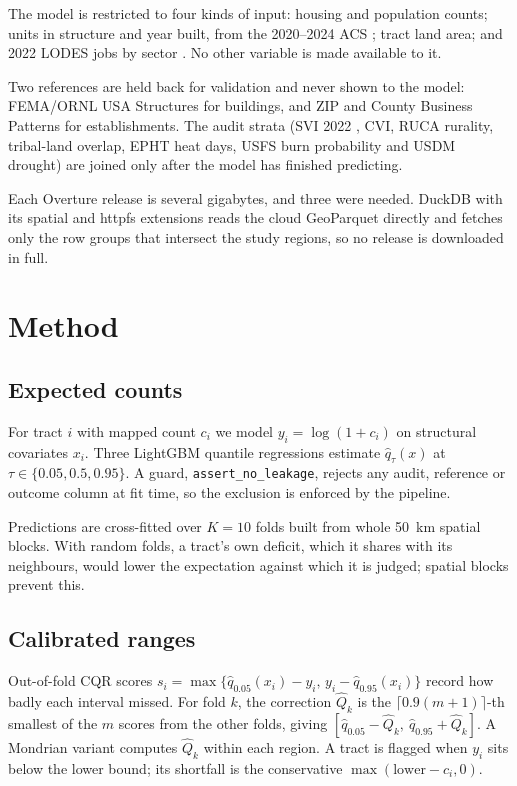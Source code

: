 \documentclass[conference]{IEEEtran}
\begin{document}
The model is restricted to four kinds of input: housing and population counts; units in structure and year built, from the 2020--2024 ACS \cite{acs}; tract land area; and 2022 LODES jobs by sector \cite{lodes}. No other variable is made available to it.

Two references are held back for validation and never shown to the model: FEMA/ORNL USA Structures \cite{usastructures} for buildings, and ZIP and County Business Patterns \cite{cbp} for establishments. The audit strata (SVI 2022 \cite{flanagan2011}, CVI, RUCA rurality, tribal-land overlap, EPHT heat days, USFS burn probability \cite{wrc} and USDM drought) are joined only after the model has finished predicting.

Each Overture release is several gigabytes, and three were needed. DuckDB with its spatial and httpfs extensions reads the cloud GeoParquet directly and fetches only the row groups that intersect the study regions, so no release is downloaded in full.

\section{Method}
\subsection{Expected counts}
For tract $i$ with mapped count $c_i$ we model $y_i=\log(1+c_i)$ on structural covariates $x_i$. Three LightGBM \cite{ke2017} quantile regressions estimate $\hat q_\tau(x)$ at $\tau\in\{0.05,0.5,0.95\}$. A guard, \texttt{assert\_no\_leakage}, rejects any audit, reference or outcome column at fit time, so the exclusion is enforced by the pipeline.

Predictions are cross-fitted over $K=10$ folds built from whole \SI{50}{km} spatial blocks. With random folds, a tract's own deficit, which it shares with its neighbours, would lower the expectation against which it is judged; spatial blocks prevent this.

\subsection{Calibrated ranges}
Out-of-fold CQR scores $s_i=\max\{\hat q_{0.05}(x_i)-y_i,\,y_i-\hat q_{0.95}(x_i)\}$ record how badly each interval missed. For fold $k$, the correction $\hat Q_k$ is the $\lceil 0.9(m+1)\rceil$-th smallest of the $m$ scores from the other folds, giving $[\hat q_{0.05}-\hat Q_k,\ \hat q_{0.95}+\hat Q_k]$. A Mondrian variant computes $\hat Q_k$ within each region. A tract is flagged when $y_i$ sits below the lower bound; its shortfall is the conservative $\max(\text{lower}-c_i,0)$.
\end{document}
